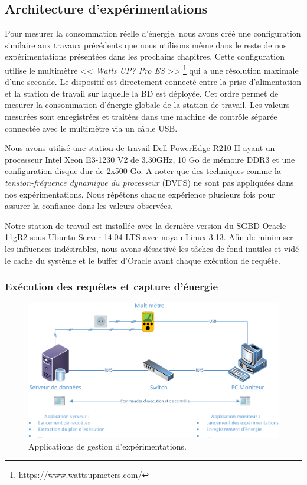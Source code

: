 \subsection{Architecture d'expérimentations}
Pour mesurer la consommation réelle d'énergie, nous avons créé une configuration similaire aux travaux précédents \cite{Rodriguez11, Xu10b, Kunjir12} que nous utilisons même dans le reste de nos expérimentations présentées dans les prochains chapitres. Cette configuration utilise le multimètre << \textit{Watts UP? Pro ES} >> \footnote{https://www.wattsupmeters.com/} qui a une résolution maximale d'une seconde.
Le dispositif est directement connecté entre la prise d'alimentation et la station de travail sur laquelle la BD est déployée. Cet ordre permet de mesurer la consommation d'énergie globale de la station de travail. Les valeurs mesurées sont enregistrées et traitées dans une machine de contrôle séparée connectée avec le multimètre via un câble USB.

Nous avons utilisé une station de travail Dell PowerEdge R210 II ayant un processeur Intel Xeon E3-1230 V2 de 3.30GHz, 10 Go de mémoire DDR3 et une configuration disque dur de 2x500 Go. A noter que des techniques comme la \textit{tension-fréquence dynamique du processeur} (DVFS) ne sont pas appliquées dans nos expérimentations. Nous répétons chaque expérience plusieurs fois pour assurer la confiance dans les valeurs observées.

Notre station de travail est installée avec la dernière version du SGBD Oracle 11gR2 sous Ubuntu Server 14.04 LTS avec noyau Linux 3.13. Afin de minimiser les influences indésirables, nous avons désactivé les tâches de fond inutiles et vidé le cache du système et le buffer d'Oracle avant chaque exécution de requête.

\subsubsection{Exécution des requêtes et capture d'énergie}

\begin{figure}
 \centering
 \includegraphics[scale=0.7]{chapitre4/chap4Fig/experiment-setup.pdf}
 \caption{Applications de gestion d'expérimentations.}
 \label{fig:experiment-setup}
\end{figure}

